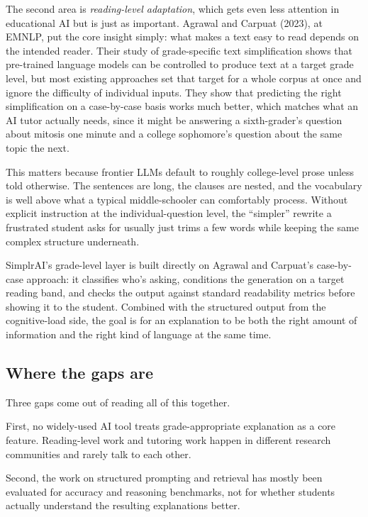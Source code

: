 \documentclass[11pt,letterpaper]{article}
\begin{document}
The second area is \emph{reading-level adaptation}, which gets even less
attention in educational AI but is just as important. Agrawal and Carpuat
(2023), at EMNLP, put the core insight simply: what makes a text easy to read
depends on the intended reader. Their study of grade-specific text
simplification shows that pre-trained language models can be controlled to
produce text at a target grade level, but most existing approaches set that
target for a whole corpus at once and ignore the difficulty of individual
inputs. They show that predicting the right simplification on a case-by-case
basis works much better, which matches what an AI tutor actually needs,
since it might be answering a sixth-grader's question about mitosis one minute
and a college sophomore's question about the same topic the next.

This matters because frontier LLMs default to roughly college-level prose
unless told otherwise. The sentences are long, the clauses are nested, and
the vocabulary is well above what a typical middle-schooler can comfortably
process. Without explicit instruction at the individual-question level, the
``simpler'' rewrite a frustrated student asks for usually just trims a few
words while keeping the same complex structure underneath.

SimplrAI's grade-level layer is built directly on Agrawal and Carpuat's
case-by-case approach: it classifies who's asking, conditions the generation
on a target reading band, and checks the output against standard readability
metrics before showing it to the student. Combined with the structured output
from the cognitive-load side, the goal is for an explanation to be both the
right amount of information and the right kind of language at the same time.

\subsection{Where the gaps are}

Three gaps come out of reading all of this together.

First, no widely-used AI tool treats grade-appropriate explanation as a core
feature. Reading-level work and tutoring work happen in different research
communities and rarely talk to each other.

Second, the work on structured prompting and retrieval has mostly been
evaluated for accuracy and reasoning benchmarks, not for whether students
actually understand the resulting explanations better.
\end{document}
